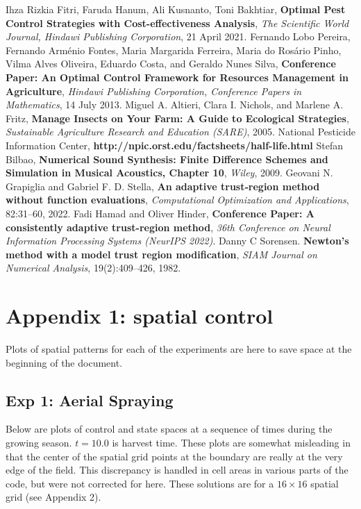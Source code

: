 \documentclass[11pt]{article}
\begin{document}

%
%

\begin{thebibliography}{1}
 Ihza Rizkia Fitri, Faruda Hanum, Ali Kusnanto, Toni Bakhtiar, \textbf{Optimal Pest Control Strategies with Cost-effectiveness Analysis}, \textit{The Scientific World Journal, Hindawi Publishing Corporation}, 21 April 2021.
 Fernando Lobo Pereira, Fernando Arménio Fontes, Maria Margarida Ferreira, 
Maria do Rosário Pinho, Vilma Alves Oliveira, Eduardo Costa, and Geraldo Nunes Silva, \textbf{Conference Paper: An Optimal Control Framework for Resources Management in Agriculture}, \textit{Hindawi Publishing Corporation, Conference Papers in Mathematics},  14 July 2013.
 Miguel A. Altieri, Clara I. Nichols, and Marlene A. Fritz, 
\textbf{Manage Insects on Your Farm: A Guide to Ecological Strategies},
\textit{Sustainable Agriculture Research and Education (SARE)}, 2005.
 National Pesticide Information Center, \textbf{http://npic.orst.edu/factsheets/half-life.html}
 Stefan Bilbao,
\textbf{Numerical Sound Synthesis: Finite Difference Schemes and Simulation in Musical Acoustics, Chapter 10},
\textit{Wiley}, 2009.
 Geovani N. Grapiglia and Gabriel F. D. Stella, \textbf{An adaptive trust‑region method without function evaluations}, \textit{Computational Optimization and Applications},  82:31–60, 2022.
 Fadi Hamad and Oliver Hinder, \textbf{Conference Paper: A consistently adaptive trust-region method}, \textit{36th Conference on Neural Information Processing Systems (NeurIPS 2022)}.
 Danny C Sorensen. \textbf{Newton’s method with a model trust region modification}, \textit{SIAM Journal on
Numerical Analysis}, 19(2):409–426, 1982.
\end{thebibliography}


\section{Appendix 1: spatial control}

Plots of spatial patterns for each of the experiments are here to save space at the beginning of the document.

\subsection{Exp 1: Aerial Spraying}

Below are plots of control and state spaces at a sequence of times during the growing season. $t=10.0$ is harvest time. These plots are somewhat misleading in that the center of the spatial grid points at the boundary are really at the very edge of the field. This discrepancy is handled in cell areas in various parts of the code, but were not corrected for here. These solutions are for a $16 \times 16$ spatial grid (see Appendix 2).
\end{document}
